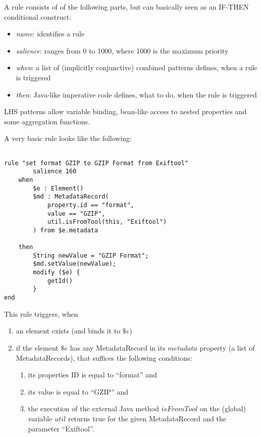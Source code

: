 \documentclass[a4paper,12pt]{article}
\begin{document}
A rule consists of of the following parts, but can basically seen as an IF-THEN conditional construct:
\begin{itemize}
\item \emph{name}: identifies a rule
\item \emph{salience}: ranges from 0 to 1000, where 1000 is the maximum priority
\item \emph{when}: a list of (implicitly conjunctive) combined patterns defines, when a rule is triggered
\item \emph{then}: Java-like imperative code defines, what to do, when the rule is triggered
\end{itemize}

LHS patterns allow variable binding, bean-like access to nested properties and some aggregation functions.

A very basic rule looks like the following:
\begin{lstlisting}

rule "set format GZIP to GZIP Format from Exiftool"
        salience 160
    when 
        $e : Element()
        $md : MetadataRecord(
            property.id == "format", 
            value == "GZIP",
            util.isFromTool(this, "Exiftool")
        ) from $e.metadata

    then
        String newValue = "GZIP Format";
        $md.setValue(newValue);
        modify ($e) {
            getId()
        }
end
\end{lstlisting}

This rule triggers, when
\begin{enumerate}
 \item an element exists (and binds it to $\$e$)
 \item if the element $\$e$ has any MetadataRecord in its $metadata$ property (a list of MetadataRecords), that suffices the following conditions:
    \begin{enumerate}
      \item its properties ID is equal to ``format'' and
      \item its value is equal to ``GZIP'' and
      \item the execution of the external Java method $isFromTool$ on the (global) variable $util$ returns true for the given MetadataRecord and the parameter ``Exiftool''.
    \end{enumerate}
\end{enumerate}
\end{document}
